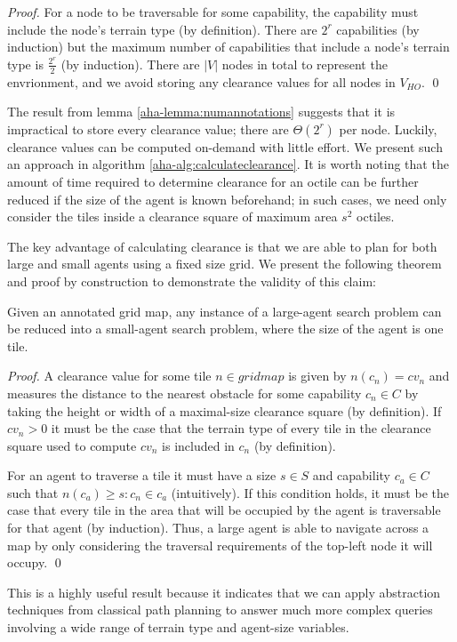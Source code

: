 \begin{proof}
For a node to be traversable for some capability, the capability must include the node's terrain type (by definition). 
There are $2^r$ capabilities (by induction) but the maximum number of capabilities that include a node's terrain type is $\frac{2^r}{2}$ (by induction). 
There are $|V|$ nodes in total to represent the envrionment, and we avoid storing any clearance values for all nodes in $V_{HO}$. 
\qed
\end{proof}

The result from lemma \ref{aha-lemma:numannotations} suggests that it is impractical to store every clearance value; there are $\Theta(2^r)$ per node.
Luckily, clearance values can be computed on-demand with little effort. 
We present such an approach in algorithm \ref{aha-alg:calculateclearance}. 
It is worth noting that the amount of time required to determine clearance for an octile can be further reduced if the size of the agent is known beforehand; in such cases, we need only consider the tiles inside a clearance square of maximum area $s^2$ octiles.

\par \indent
The key advantage of calculating clearance is that we are able to plan for both large and small agents using a fixed size grid. We present the following theorem and proof by construction to demonstrate the validity of this claim:
\begin{theorem}
\label{aha-theorem:reducibility}
Given an annotated grid map, any instance of a large-agent search problem can be reduced into a small-agent search problem, where the size of the agent is one tile.
\end{theorem}

\begin{proof}
A clearance value for some tile $n \in gridmap$ is given by $n(c_{n}) = cv_{n}$ and measures the distance to the nearest obstacle for some capability $c_{n} \in C$ by taking the height or width of a maximal-size clearance square (by definition). 
If $cv_{n} > 0$ it must be the case that the terrain type of every tile in the clearance square used to compute $cv_{n}$ is included in $c_{n}$ (by definition). 
\par \indent
For an agent to traverse a tile it must have a size $s \in S$ and capability $c_{a} \in C$ such that $n(c_{a}) \geq s : c_{n} \in c_{a} $ (intuitively).
If this condition holds, it must be the case that every tile in the area that will be occupied by the agent is traversable for that agent (by induction). 
Thus, a large agent is able to navigate across a map by only considering the traversal requirements of the top-left node it will occupy. \qed
\end{proof}
This is a highly useful result because it indicates that we can apply abstraction techniques from classical path planning to answer much more complex queries involving a wide range of terrain type and agent-size variables.
